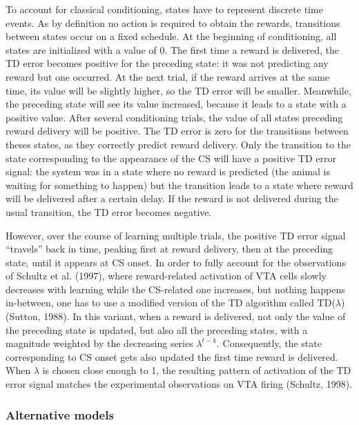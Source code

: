 \documentclass[
  11pt,
  a4paper,
]{scrbook}
\begin{document}
To account for classical conditioning, states have to represent discrete
time events. As by definition no action is required to obtain the
rewards, transitions between states occur on a fixed schedule. At the
beginning of conditioning, all states are initialized with a value of 0.
The first time a reward is delivered, the TD error becomes positive for
the preceding state: it was not predicting any reward but one occurred.
At the next trial, if the reward arrives at the same time, its value
will be slightly higher, so the TD error will be smaller. Meanwhile, the
preceding state will see its value increased, because it leads to a
state with a positive value. After several conditioning trials, the
value of all states preceding reward delivery will be positive. The TD
error is zero for the transitions between theses states, as they
correctly predict reward delivery. Only the transition to the state
corresponding to the appearance of the CS will have a positive TD error
signal: the system was in a state where no reward is predicted (the
animal is waiting for something to happen) but the transition leads to a
state where reward will be delivered after a certain delay. If the
reward is not delivered during the usual transition, the TD error
becomes negative.

However, over the course of learning multiple trials, the positive TD
error signal ``travels'' back in time, peaking first at reward delivery,
then at the preceding state, until it appears at CS onset. In order to
fully account for the observations of Schultz et al. (1997), where
reward-related activation of VTA cells slowly decreases with learning
while the CS-related one increases, but nothing happens in-between, one
has to use a modified version of the TD algorithm called TD(\(\lambda\))
(Sutton, 1988). In this variant, when a reward is delivered, not only
the value of the preceding state is updated, but also all the preceding
states, with a magnitude weighted by the decreasing series
\(\lambda^{t-k}\). Consequently, the state corresponding to CS onset
gets also updated the first time reward is delivered. When \(\lambda\)
is chosen close enough to 1, the resulting pattern of activation of the
TD error signal matches the experimental observations on VTA firing
(Schultz, 1998).

\subsubsection*{Alternative models}\label{alternative-models}
\end{document}

